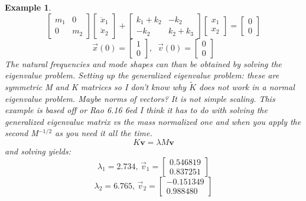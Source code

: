 \documentclass[12pt,letter]{article}
\newtheorem{ex}{Example}
\numberwithin{ex}{section} %
\newenvironment{example}{\begin{mdframed}[middlelinewidth=0.5mm]\begin{ex}\normalfont}{\end{ex}\end{mdframed}}
\numberwithin{re}{section} %
\newcommand{\rd}[1]{\textcolor[rgb]{0.75,0.00,0.00}{#1}}
\begin{document}
\begin{example}
\begin{equation}
	  \begin{bmatrix} m_1 & 0 \\    0  & m_2 \end{bmatrix} \begin{bmatrix} \ddot{x}_1 \\    \ddot{x}_2  \end{bmatrix} + \begin{bmatrix} k_1 + k_2 & -k_2 \\  -k_2  & k_2 + k_3 \end{bmatrix} \begin{bmatrix} x_1 \\    x_2  \end{bmatrix} = \begin{bmatrix} 0 \\  0  \end{bmatrix} 
\end{equation}
\begin{equation}
	  \vec{x}(0) = \begin{bmatrix} 1 \\  0 \end{bmatrix},\; \; \vec{v}(0) = \begin{bmatrix} 0 \\  0 \end{bmatrix} \nonumber
\end{equation}
The natural frequencies and mode shapes can than be obtained by solving the eigenvalue problem. Setting up the generalized eigenvalue problem: \rd{these are symmetric M and K matrices so I don't know why $\tilde{K}$ does not work in a normal eigenvalue problem. Maybe norms of vectors? It is not simple scaling. This example is based off or Rao 6.16 6ed} \rd{I think it has to do with solving the generalized eigenvalue matrix vs the mass normalized one and when you apply the second M$^{-1/2}$ as you need it all the time. }
\begin{equation}
K \textbf{v} = \lambda M \textbf{v}
\end{equation}
and solving yields:
\begin{equation}
\lambda_1 = 2.734 \text{, } \vec{v}_1 = \begin{bmatrix} 0.546819 \\  0.837251 \end{bmatrix} 
\end{equation}
\begin{equation}
\lambda_2 = 6.765 \text{, } \vec{v}_2 = \begin{bmatrix} -0.151349 \\  0.988480 \end{bmatrix}  \nonumber

\end{equation}
\end{example}
\end{document}
